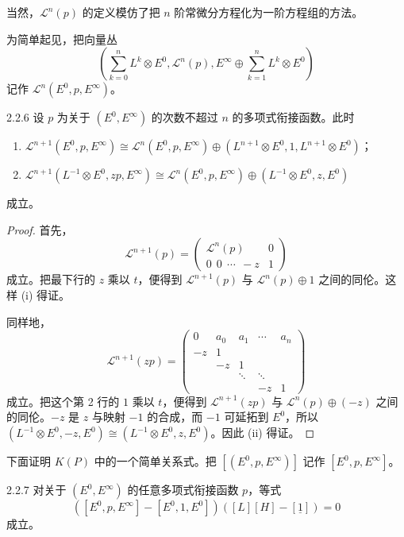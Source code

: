 \begin{remark}{}
  当然，$\mathcal{L}^n(p)$ 的定义模仿了把 $n$ 阶常微分方程化为一阶方程组的方法。
\end{remark}

为简单起见，把向量丛
\[
\left(\sum_{k=0}^{n}L^k\otimes E^0,\mathcal{L}^n(p),E^\infty\oplus\sum_{k=1}^{n}L^k\otimes E^0\right)
\]
记作 $\mathcal{L}^n(E^0,p,E^\infty)$。

\begin{lemma*}{2.2.6}
  设 $p$ 为关于 $(E^0,E^\infty)$ 的次数不超过 $n$ 的多项式衔接函数。此时
  \begin{enumerate}[label=(\roman*),leftmargin=2.2em,itemsep=2pt]
  \item $\mathcal{L}^{n+1}(E^0,p,E^\infty)\cong\mathcal{L}^n(E^0,p,E^\infty)\oplus(L^{n+1}\otimes E^0,1,L^{n+1}\otimes E^0)$；
  \item $\mathcal{L}^{n+1}(L^{-1}\otimes E^0,zp,E^\infty)\cong\mathcal{L}^n(E^0,p,E^\infty)\oplus(L^{-1}\otimes E^0,z,E^0)$
  \end{enumerate}
  成立。
\end{lemma*}

\begin{proof}
  首先，
  \[
  \mathcal{L}^{n+1}(p)=
  \begin{pmatrix}
  \mathcal{L}^n(p) & 0\\
  0\ \ 0\ \ \cdots\ \ -z & 1
  \end{pmatrix}
  \]
  成立。把最下行的 $z$ 乘以 $t$，便得到 $\mathcal{L}^{n+1}(p)$ 与 $\mathcal{L}^n(p)\oplus1$ 之间的同伦。这样 (i) 得证。

  同样地，
\[
\mathcal{L}^{n+1}(zp)=
\begin{pmatrix}
0 & a_0 & a_1 & \cdots & a_n\\
-z & 1 & & & \\
& -z & 1 & & \\
& & \ddots & \ddots & \\
& & & -z & 1
\end{pmatrix}
\]
成立。把这个第 2 行的 $1$ 乘以 $t$，便得到 $\mathcal{L}^{n+1}(zp)$ 与 $\mathcal{L}^n(p)\oplus(-z)$ 之间的同伦。$-z$ 是 $z$ 与映射 $-1$ 的合成，而 $-1$ 可延拓到 $E^0$，所以 $(L^{-1}\otimes E^0,-z,E^0)\cong(L^{-1}\otimes E^0,z,E^0)$。因此 (ii) 得证。
\end{proof}

下面证明 $K(P)$ 中的一个简单关系式。把 $[(E^0,p,E^\infty)]$ 记作 $[E^0,p,E^\infty]$。

\begin{proposition*}{2.2.7}
  对关于 $(E^0,E^\infty)$ 的任意多项式衔接函数 $p$，等式
  \[
  ([E^0,p,E^\infty]-[E^0,1,E^0])([L][H]-[\underline{1}])=0
  \]
  成立。
\end{proposition*}

